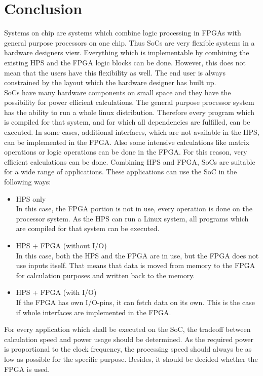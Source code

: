 \chapter{Conclusion}
  \label{kap:ausblick}
  Systems on chip are systems which combine logic processing in FPGAs with general purpose processors on one chip. Thus SoCs are very flexible systems in a hardware designers view. Everything which is implementable by combining the existing HPS and the FPGA logic blocks can be done. However, this does not mean that the users have this flexibility as well. The end user is always constrained by the layout which the hardware designer has built up.\\
  SoCs have many hardware components on small space and they have the possibility for power efficient calculations. The general purpose processor system has the ability to run a whole linux distribution. Therefore every program which is compiled for that system, and for which all dependencies are fulfilled, can be executed. In some cases, additional interfaces, which are not available in the HPS, can be implemented in the FPGA. Also some intensive calculations like matrix operations or logic operations can be done in the FPGA. For this reason, very efficient calculations can be done. Combining HPS and FPGA, SoCs are suitable for a wide range of applications. These applications can use the SoC in the following ways:
 \begin{itemize}
 \item HPS only\\
 In this case, the FPGA portion is not in use, every operation is done on the processor system. As the HPS can run a Linux system, all programs which are compiled for that system can be executed. 
 \item HPS + FPGA (without I/O)\\
 In this case, both the HPS and the FPGA are in use, but the FPGA does not use inputs itself. That means that data is moved from memory to the FPGA for calculation purposes and written back to the memory. 
 \item HPS + FPGA (with I/O)\\
 If the FPGA has own I/O-pins, it can fetch data on its own. This is the case if whole interfaces are implemented in the FPGA. 
 \end{itemize}
 For every application which shall be executed on the SoC, the tradeoff between calculation speed and power usage should be determined. As the required power is proportional to the clock frequency, the processing speed should always be as low as possible for the specific purpose. Besides, it should be decided whether the FPGA is used.\\
